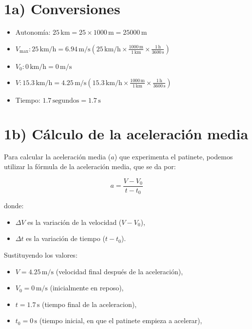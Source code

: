 \documentclass{article}
\begin{document}

\section*{1a) Conversiones}

\begin{itemize}
    \item Autonomía: \(25 \, \text{km} = 25 \times 1000 \, \text{m} = 25000 \, \text{m}\)
    \item \(V_{\text{max}}: 25 \, \text{km/h} = 6.94 \, \text{m/s} \left( 25 \, \text{km/h} \times \frac{1000 \, \text{m}}{1 \, \text{km}} \times \frac{1 \, \text{h}}{3600 \, \text{s}} \right)\)
    \item \(V_0: 0 \, \text{km/h} = 0 \, \text{m/s}\)
    \item \(V: 15.3 \, \text{km/h} = 4.25 \, \text{m/s} \left( 15.3 \, \text{km/h} \times \frac{1000 \, \text{m}}{1 \, \text{km}} \times \frac{1 \, \text{h}}{3600 \, \text{s}} \right)\)
    \item Tiempo: \(1.7 \, \text{segundos} = 1.7 \, \text{s}\)
\end{itemize}


\section*{1b) Cálculo de la aceleración media}

Para calcular la aceleración media (\(a\)) que experimenta el patinete, podemos utilizar la fórmula de la aceleración media, que se da por:

\[
a = \frac{V - V_0}{t - t_0}
\]

donde:
\begin{itemize}
    \item \(\Delta V\) es la variación de la velocidad (\(V - V_0\)),
    \item \(\Delta t\) es la variación de tiempo (\(t - t_0\)).
\end{itemize}

Sustituyendo los valores:

\begin{itemize}
    \item \(V = 4.25 \, \text{m/s}\) (velocidad final después de la aceleración),
    \item \(V_0 = 0 \, \text{m/s}\) (inicialmente en reposo),
    \item \(t = 1.7 \, \text{s}\) (tiempo final de la aceleracion),
    \item \(t_0 = 0 \, \text{s}\) (tiempo inicial, en que el patinete empieza a acelerar),

\end{itemize}
\end{document}
